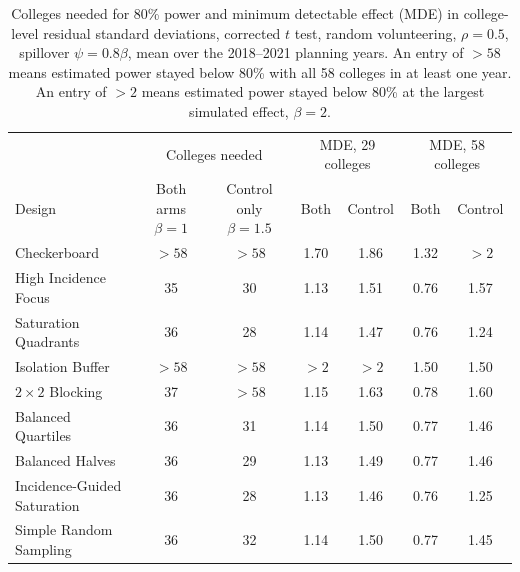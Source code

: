 \documentclass[11pt]{article}
\begin{document}
\begin{table}[!htb]
\small
\centering
\caption{Colleges needed for 80\% power and minimum detectable effect (MDE) in college-level residual standard deviations, corrected $t$ test, random volunteering, $\rho = 0.5$, spillover $\psi = 0.8\beta$, mean over the 2018--2021 planning years. An entry of $>58$ means estimated power stayed below 80\% with all 58 colleges in at least one year. An entry of $>2$ means estimated power stayed below 80\% at the largest simulated effect, $\beta=2$.}
\label{tab:nc-power}
\begin{tabular}{lcccccc}
\toprule
& \multicolumn{2}{c}{Colleges needed} & \multicolumn{2}{c}{MDE, 29 colleges} & \multicolumn{2}{c}{MDE, 58 colleges} \\
\cmidrule(lr){2-3}\cmidrule(lr){4-5}\cmidrule(lr){6-7}
Design & \shortstack{Both arms\\$\beta = 1$} & \shortstack{Control only\\$\beta = 1.5$} & Both & Control & Both & Control \\
\midrule
Checkerboard & $>58$ & $>58$ & 1.70 & 1.86 & 1.32 & $>2$ \\
High Incidence Focus & 35 & 30 & 1.13 & 1.51 & 0.76 & 1.57 \\
Saturation Quadrants & 36 & 28 & 1.14 & 1.47 & 0.76 & 1.24 \\
Isolation Buffer & $>58$ & $>58$ & $>2$ & $>2$ & 1.50 & 1.50 \\
$2\times2$ Blocking & 37 & $>58$ & 1.15 & 1.63 & 0.78 & 1.60 \\
Balanced Quartiles & 36 & 31 & 1.14 & 1.50 & 0.77 & 1.46 \\
Balanced Halves & 36 & 29 & 1.13 & 1.49 & 0.77 & 1.46 \\
Incidence-Guided Saturation & 36 & 28 & 1.13 & 1.46 & 0.76 & 1.25 \\
Simple Random Sampling & 36 & 32 & 1.14 & 1.50 & 0.77 & 1.45 \\
\bottomrule
\end{tabular}
\end{table}
\end{document}
